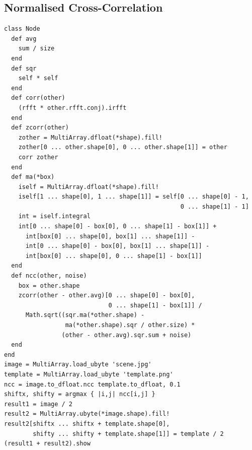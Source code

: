 \documentclass[12pt,a4paper,oneside,openright]{book}
\begin{document}
\begin{CJK}{UTF8}{}
\subsection{Normalised Cross-Correlation}\label{cha:ncc}
\begin{lstlisting}
class Node
  def avg
    sum / size
  end
  def sqr
    self * self
  end
  def corr(other)
    (rfft * other.rfft.conj).irfft
  end
  def zcorr(other)
    zother = MultiArray.dfloat(*shape).fill!
    zother[0 ... other.shape[0], 0 ... other.shape[1]] = other
    corr zother
  end
  def ma(*box)
    iself = MultiArray.dfloat(*shape).fill!
    iself[1 ... shape[0], 1 ... shape[1]] = self[0 ... shape[0] - 1,
                                                 0 ... shape[1] - 1]
    int = iself.integral
    int[0 ... shape[0] - box[0], 0 ... shape[1] - box[1]] +
      int[box[0] ... shape[0], box[1] ... shape[1]] -
      int[0 ... shape[0] - box[0], box[1] ... shape[1]] -
      int[box[0] ... shape[0], 0 ... shape[1] - box[1]]
  end
  def ncc(other, noise)
    box = other.shape
    zcorr(other - other.avg)[0 ... shape[0] - box[0],
                             0 ... shape[1] - box[1]] /
      Math.sqrt((sqr.ma(*other.shape) -
                 ma(*other.shape).sqr / other.size) *
                (other - other.avg).sqr.sum + noise)
  end
end
image = MultiArray.load_ubyte 'scene.jpg'
template = MultiArray.load_ubyte 'template.png'
ncc = image.to_dfloat.ncc template.to_dfloat, 0.1
shiftx, shifty = argmax { |i,j| ncc[i,j] }
result1 = image / 2
result2 = MultiArray.ubyte(*image.shape).fill!
result2[shiftx ... shiftx + template.shape[0],
        shifty ... shifty + template.shape[1]] = template / 2
(result1 + result2).show
\end{lstlisting}


\end{CJK}
\end{document}
